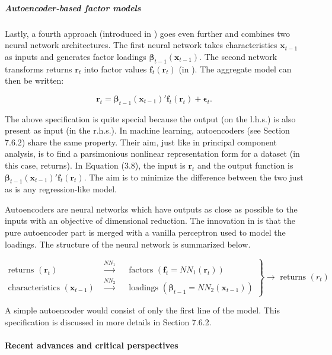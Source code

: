 \subparagraph{Autoencoder-based factor models}

Lastly, a fourth approach (introduced in \cite{gu2018empirical}) goes even further and combines two neural network architectures. The first neural network takes characteristics $\textbf{x}_{t -1}$ as inputs and generates factor loadings $\boldsymbol{\beta}_{t -1}(\textbf{x}_{t -1})$. The second network transforms returns $\textbf{r}_t$ into factor values $\textbf{f}_t(\textbf{r}_t)$ (in \cite{feng2019deep}). The aggregate model can then be written:

\begin{equation}
\label{autoencoder_kelly}
\textbf{r}_t=\boldsymbol{\beta}_{t-1}(\textbf{x}_{t-1})'\textbf{f}_t(\textbf{r}_t)+\boldsymbol{\epsilon}_t.
\end{equation}

The above specification is quite special because the output (on the l.h.s.) is also present as input (in the r.h.s.). In machine learning, autoencoders (see Section 7.6.2) share the same property. Their aim, just like in principal component analysis, is to find a parsimonious nonlinear representation form for a dataset (in this case, returns). In Equation (3.8), the input is $\textbf{r}_t$ and the output function is $\boldsymbol{\beta}_{t -1}(\textbf{x}_{t -1})'\textbf{f}_t(\textbf{r}_t)$. The aim is to minimize the difference between the two just as is any regression-like model.

Autoencoders are neural networks which have outputs as close as possible to the inputs with an objective of dimensional reduction. The innovation in \cite{gu2018empirical} is that the pure autoencoder part is merged with a vanilla perceptron used to model the loadings. The structure of the neural network is summarized below.

$\left. \begin{array}{rl}
\text{returns } (\textbf{r}_t) & \overset{NN_1}{\longrightarrow} \quad \text{ factors } (\textbf{f}_t=NN_1(\textbf{r}_t)) \\
\text{characteristics } (\textbf{x}_{t -1}) & \overset{NN_2}{\longrightarrow} \quad \text{ loadings } (\boldsymbol{\beta}_{t -1}=NN_2(\textbf{x}_{t -1}))
\end{array} \right\} \longrightarrow \text{ returns } (r_t)$

A simple autoencoder would consist of only the first line of the model. This specification is discussed in more details in Section 7.6.2.

\paragraph{Recent advances and critical perspectives}

